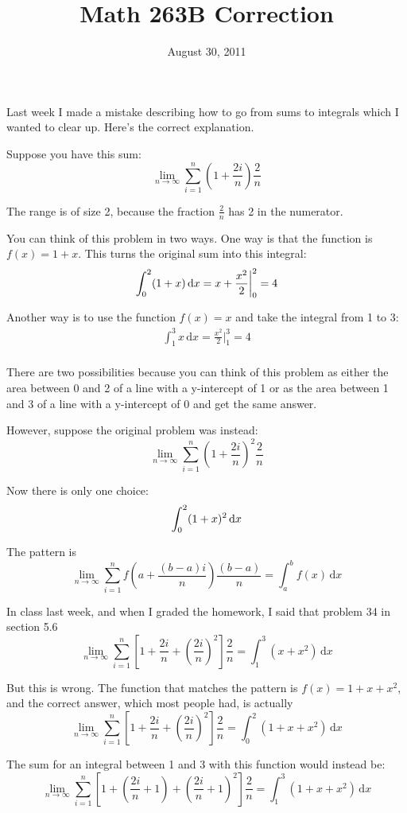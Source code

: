 \documentclass{article}
\title{Math 263B Correction}
\date{August 30, 2011}
\begin{document}
\maketitle

Last week I made a mistake describing how to go from sums to integrals which I wanted to clear up.  Here's the correct explanation.

Suppose you have this sum:
\[
\lim_{n \to \infty} \sum_{i = 1}^n \left(1 + \frac{2i}{n}\right) \frac{2}{n}
\]

The range is of size 2, because the fraction $\frac{2}{n}$ has 2 in the numerator.

You can think of this problem in two ways. One way is that the function is $f(x) = 1 + x$.  This turns the original sum
into this integral:
\[
  \int_0^2 (1 + x) \, \mathrm{d}x = x + \frac{x^2}{2} \bigg|_0^2 = 4 \\
\]

Another way is to use the function $f(x) = x$ and take the integral from 1 to 3:
\begin{align*}
  \int_1^3 x \, \mathrm{d}x = \frac{x^2}{2} \bigg|_1^3 = 4 \\
\end{align*}

There are two possibilities because you can think of this problem as either the area between 0 and 2 of a line with a
y-intercept of 1 or as the area between 1 and 3 of a line with a y-intercept of 0 and get the same answer.

However, suppose the original problem was instead:
\[
\lim_{n \to \infty} \sum_{i = 1}^n \left(1 + \frac{2i}{n}\right)^2 \frac{2}{n}
\]

Now there is only one choice:
\[
  \int_0^2 (1 + x)^2 \, \mathrm{d}x \\
\]

The pattern is
\[
  \lim_{n \to \infty} \sum_{i = 1}^n f \left(a + \frac{(b - a)i}{n}\right) \frac{(b - a)}{n} = \int_a^b  f(x) \, \mathrm{d}x
\]

In class last week, and when I graded the homework, I said that problem 34 in section 5.6
\[
  \lim_{n \to \infty} \sum_{i = 1}^n \left[ 1 + \frac{2i}{n} + \left( \frac{2i}{n} \right)^2 \right] \frac{2}{n}
  = \int_1^3 (x + x^2) \, \mathrm{d}x
\]

But this is wrong.  The function that matches the pattern is $f(x) = 1 + x + x^2$, and the correct answer, which most
people had, is actually
\[
  \lim_{n \to \infty} \sum_{i = 1}^n \left[ 1 + \frac{2i}{n} + \left( \frac{2i}{n} \right)^2 \right] \frac{2}{n}
  = \int_0^2 (1 + x + x^2) \, \mathrm{d}x
\]

The sum for an integral between 1 and 3 with this function would instead be:
\[
  \lim_{n \to \infty} \sum_{i = 1}^n \left[ 1 + \left(\frac{2i}{n} + 1 \right) + \left( \frac{2i}{n} + 1 \right)^2 \right] \frac{2}{n}
  = \int_1^3 (1 + x + x^2) \, \mathrm{d}x
\]
\end{document}
